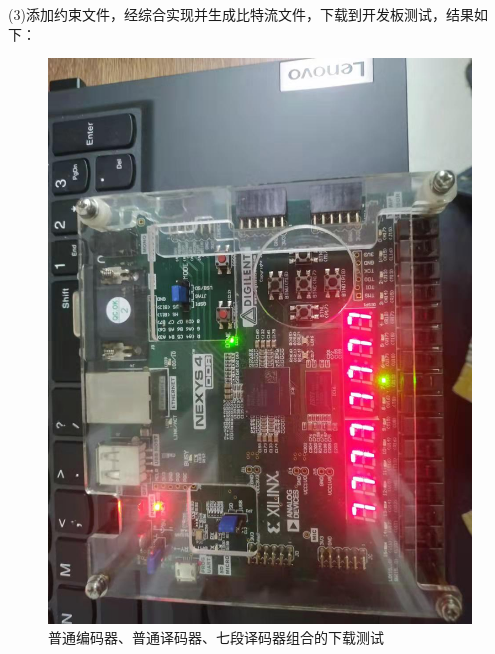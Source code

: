 \documentclass[UTF8,fontset=fandol]{ctexart}
\begin{document}
(3)添加约束文件，经综合实现并生成比特流文件，下载到开发板测试，结果如下：

\begin{figure}[H]
    \centering
    \includegraphics[scale=0.2]{微信图片_20211103201955.jpg}
    \caption{普通编码器、普通译码器、七段译码器组合的下载测试}
\end{figure}
\end{document}
